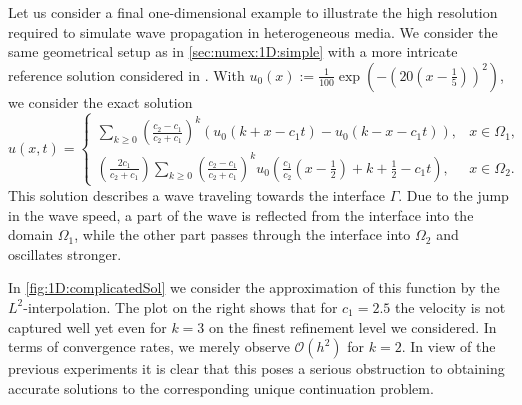 \documentclass[sn-mathphys-num]{sn-jnl}
\numberwithin{equation}{section}
\begin{document}
Let us consider a final one-dimensional example to illustrate the high resolution 
required to simulate wave propagation in heterogeneous media. 
We consider the same geometrical setup as in \cref{sec:numex:1D:simple} with a more intricate reference solution considered in \cite{BDE22,MEMM19}. With $u_0 (x) := \frac{1}{100} \exp(-(20(x-\frac{1}{5}))^2)$, we consider the exact solution 
\begin{equation}\label{eq:1D:complicatedSol}
    u(x,t) = \begin{cases}
      \sum_{k \ge 0} \left( \frac{c_2-c_1}{c_2+c_1}\right)^k \left( u_0 (k + x - c_1 t) - u_0(k-x-c_1 t)\right), &x \in \Omega_1, \\
      \left( \frac{2c_1}{c_2+c_1}\right) \sum_{k \ge 0} \left( \frac{c_2 - c_1}{c_2 + c_1}\right)^k u_0 \left( \frac{c_1}{c_2} \left( x - \frac{1}{2}\right) +k + \frac{1}{2} - c_1 t \right), & x \in \Omega_2. 
    \end{cases}
\end{equation}
This solution describes a wave traveling towards the interface $\Gamma$. Due to the jump in the wave speed, a part of the wave is reflected from the interface into the domain $\Omega_1$, while the other part passes through the interface into $\Omega_2$ and oscillates stronger. 

In \cref{fig:1D:complicatedSol} we consider the approximation of this function by the $L^2$-interpolation. The plot on the right shows that for $c_1 = 2.5$ the velocity is not captured well yet even for $k=3$ on the finest refinement level we considered. In terms of convergence rates, we merely observe $\mathcal{O}(h^2)$ for $k=2$. In view of the previous experiments it is clear that this poses a serious obstruction to obtaining accurate solutions to the corresponding unique continuation problem.
\end{document}
